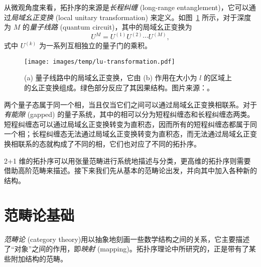 从微观角度来看，拓扑序的来源是\emph{长程纠缠} (long-range entanglement)，它可以通过\emph{局域幺正变换} (local unitary transformation) 来定义。如图~\ref{fig:lu-transformation} 所示，对于深度为 $M$ 的\emph{量子线路} (quantum circuit)，其中的局域幺正变换为
\begin{equation}
  U^M = U^{(1)} U^{(2)} \cdots U^{(M)},
\end{equation}
式中 $U^{(k)}$ 为一系列互相独立的量子门的乘积。

\begin{figure}[htb]
  \centering
  \texttt{[image: images/temp/lu-transformation.pdf]}
  \caption[量子线路中的局域幺正变换]{(a) 量子线路中的局域幺正变换，它由 (b) 作用在大小为 $l$ 的区域上的幺正变换组成。绿色部分反应了其因果结构。图片来源：\parencite{wen2013topological}。}
  \label{fig:lu-transformation}
\end{figure}

两个量子态属于同一个相，当且仅当它们之间可以通过局域幺正变换相联系。对于\emph{有能隙} (gapped) 的量子系统，其中的相可以分为短程纠缠态和长程纠缠态两类。短程纠缠态可以通过局域幺正变换转变为直积态，因而所有的短程纠缠态都属于同一个相；长程纠缠态无法通过局域幺正变换转变为直积态，而无法通过局域幺正变换相联系的态就构成了不同的相，它们也对应了不同的拓扑序。

2+1 维的拓扑序可以用张量范畴进行系统地描述与分类，更高维的拓扑序则需要借助高阶范畴来描述。接下来我们先从基本的范畴论出发，并向其中加入各种新的结构。

\section{范畴论基础}

\emph{范畴论} (category theory)\cite{baez2011physics,maclane2013categories,beer2018categories}用以抽象地刻画一些数学结构之间的关系，它主要描述了“对象”之间的作用，即\emph{映射} (mapping)。拓扑序理论中所研究的，正是带有了某些附加结构的范畴。

